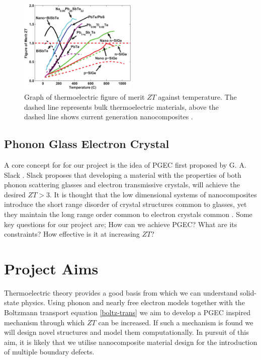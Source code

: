 \documentclass[a4paper,10pt,journal]{IEEEtran}
\begin{document}
\begin{figure}
	\centering
	\includegraphics[width=0.5\textwidth]{zt-temp-plot.png}
	\caption{Graph of thermoelectric figure of merit $ZT$ against
	temperature. The dashed line represents bulk thermoelectric materials, above the dashed line shows current generation nanocomposites \cite{minnich-review}.}
	\label{zt-plot}
\end{figure}

\subsection{Phonon Glass Electron Crystal}
A core concept for for our project is the idea of \ac{PGEC} first proposed by G. A. Slack \cite{crc-handbook}. Slack proposes that developing a material with the properties of both phonon scattering glasses and electron transmissive crystals, will achieve the desired $ZT > 3$. It is thought that the low dimensional systems of nanocomposites introduce the short range disorder of crystal structures common to glasses, yet they maintain the long range order common to electron crystals common \cite{crc-handbook}. Some key questions for our project are; How can we achieve \ac{PGEC}? What are its constraints? How effective is it at increasing $ZT$?

\section{Project Aims}
Thermoelectric theory provides a good basis from which we can
understand solid-state physics. Using phonon and nearly free electron models together with
the Boltzmann transport equation \eqref{boltz-trans} we aim to develop
a \ac{PGEC} inspired mechanism through which $ZT$ can be increased. If such a mechanism is found we will design novel structures and model them computationally. In pursuit of this aim, it is
likely that we utilise nanocomposite material design for the
introduction of multiple boundary defects.
\end{document}
